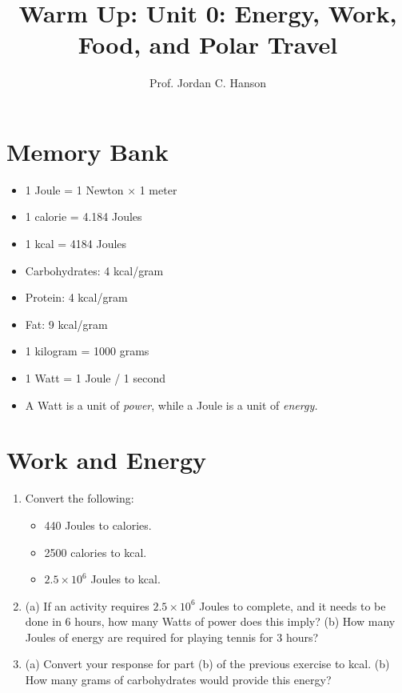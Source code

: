 \documentclass{article}
\begin{document}
\twocolumn

\title{Warm Up: Unit 0: Energy, Work, Food, and Polar Travel}
\author{Prof. Jordan C. Hanson}

\maketitle

\section{Memory Bank}
\begin{itemize}
\item 1 Joule = 1 Newton $\times$ 1 meter
\item 1 calorie = 4.184 Joules
\item 1 kcal = 4184 Joules
\item Carbohydrates: 4 kcal/gram
\item Protein: 4 kcal/gram
\item Fat: 9 kcal/gram
\item 1 kilogram = 1000 grams
\item 1 Watt = 1 Joule / 1 second
\item A Watt is a unit of \textit{power}, while a Joule is a unit of \textit{energy.}
\end{itemize}

\section{Work and Energy}

\begin{enumerate}
\item Convert the following:
\begin{itemize}
\item 440 Joules to calories.
\item 2500 calories to kcal.
\item $2.5 \times 10^6$ Joules to kcal.
\end{itemize} \vspace{2cm}
\item (a) If an activity requires $2.5 \times 10^6$ Joules to complete, and it needs to be done in 6 hours, how many Watts of power does this imply? (b) How many Joules of energy are required for playing tennis for 3 hours? \\ \vspace{3cm}
\item (a) Convert your response for part (b) of the previous exercise to kcal.  (b) How many grams of carbohydrates would provide this energy?
\end{enumerate}
\end{document}
